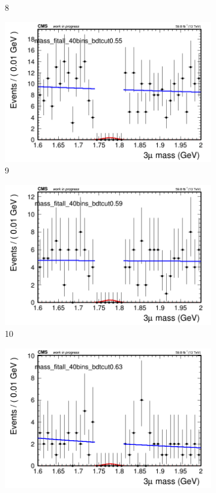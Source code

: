 \begin{figure}[h!]
\begin{subfigure}{0.2\textwidth}
        \caption{8}
    \end{subfigure}
    \begin{subfigure}{0.2\textwidth}
        \includegraphics[width=\textwidth]{power_law/plots/all/massfit_all_40bins_bdtcut0.55.png}
        \caption{9}
    \end{subfigure}
    \begin{subfigure}{0.2\textwidth}
        \includegraphics[width=\textwidth]{power_law/plots/all/massfit_all_40bins_bdtcut0.59.png}
        \caption{10}
    \end{subfigure}
    \begin{subfigure}{0.2\textwidth}
        \includegraphics[width=\textwidth]{power_law/plots/all/massfit_all_40bins_bdtcut0.63.png}

\end{subfigure}
\end{figure}
